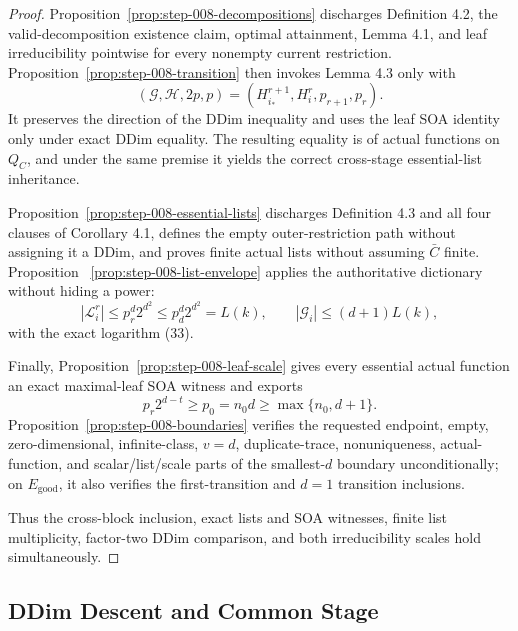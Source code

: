 \begin{proof}
Proposition~\ref{prop:step-008-decompositions} discharges Definition 4.2,
the valid-decomposition existence claim, optimal attainment, Lemma 4.1,
and leaf irreducibility pointwise for every nonempty current restriction.
Proposition~\ref{prop:step-008-transition} then invokes Lemma 4.3 only with
\[
 (\mathcal G,\mathcal H,2p,p)
 =(H_{i_*}^{r+1},H_i^r,p_{r+1},p_r).
\]
It preserves the direction of the DDim inequality and uses the leaf SOA
identity only under exact DDim equality. The resulting equality is of
actual functions on \(Q_C\), and under the same premise it yields the
correct cross-stage essential-list inheritance.

Proposition~\ref{prop:step-008-essential-lists} discharges Definition 4.3
and all four clauses of Corollary 4.1, defines the empty outer-restriction
path without assigning it a DDim, and proves finite actual lists without
assuming \(\bar C\) finite. Proposition
~\ref{prop:step-008-list-envelope} applies the authoritative dictionary
without hiding a power:
\[
 |\mathcal L_i^r|\le p_r^d2^{d^2}
 \le p_d^d2^{d^2}=L(k),
 \qquad
 |\mathcal G_i|\le(d+1)L(k),
\]
with the exact logarithm (33).

Finally, Proposition~\ref{prop:step-008-leaf-scale} gives every essential
actual function an exact maximal-leaf SOA witness and exports
\[
 p_r2^{d-t}\ge p_0=n_0d\ge\max\{n_0,d+1\}.
\]
Proposition~\ref{prop:step-008-boundaries} verifies the requested endpoint,
empty, zero-dimensional, infinite-class, \(v=d\), duplicate-trace,
nonuniqueness, actual-function, and scalar/list/scale parts of the
smallest-\(d\) boundary unconditionally; on \(E_{\mathrm{good}}\), it also
verifies the first-transition and \(d=1\) transition inclusions.

Thus the cross-block inclusion, exact lists and SOA witnesses, finite list
multiplicity, factor-two DDim comparison, and both irreducibility scales
hold simultaneously.



\end{proof}

\subsection{DDim Descent and Common Stage}\label{app:step_009}


